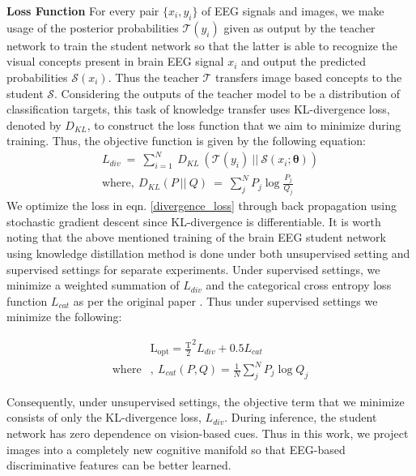 \documentclass{article}
\begin{document}
\textbf{Loss Function }
For every pair $\{x_i, y_i\}$ of EEG signals and images, we make usage of the posterior probabilities $\mathcal{T}(y_{i})$ given as output by the teacher network to train the student network so that the latter is able to recognize the visual concepts present in brain EEG signal $x_i$ and output the predicted probabilities $\mathcal{S}(x_{i})$. Thus the teacher $\mathcal{T}$ transfers image based concepts to the student $\mathcal{S}$. Considering the outputs of the teacher model to be a distribution of classification targets, this task of knowledge transfer uses KL-divergence loss, denoted by $D_{KL}$, to construct the loss function that we aim to minimize during training. Thus, the objective function is given by the following equation:
\begin{align}
\label{divergence_loss}
L_{div}\ =\ \sum_{i=1}^N \ D_{KL}\ (\mathcal{T}(y_{i})\ ||\ \mathcal{S} (x_{i};\mathbf{\theta}))    \\
\mathrm{where}, \ \label{KL_divergence}
D_{KL}( P\ ||\ Q)\ =\ \sum_j^N P_j\log \frac{P_j}{Q_j} 
\end{align}
We optimize the loss in eqn. \ref{divergence_loss} through back propagation using stochastic gradient descent since KL-divergence is differentiable. 
It is  worth noting that the above mentioned training of the brain EEG student network using knowledge distillation method is done under both unsupervised setting and supervised settings for separate experiments.  Under supervised settings, we minimize a weighted summation of $L_{div}$ and the categorical cross entropy loss function $L_{cat}$ as per the original paper \cite{hinton2015distilling}. Thus under supervised settings we minimize the following:

\begin{align}
\label{eq:total_loss}
&\mathrm{L_{opt}} =  \frac{\mathrm{T}}{2}^2 L_{div} + 0.5L_{cat} \\
\mathrm{where}&, \ L_{cat}(P,Q) = \frac{1}{N} \sum_j^N P_j \log Q_j
\end{align}

Consequently, under unsupervised settings, the objective term that we minimize consists of only the KL-divergence loss, $L_{div}$. During inference, the student network has zero dependence on vision-based cues. Thus in this work, we project images into a completely new cognitive manifold so that EEG-based discriminative features can be better learned. 
\end{document}
